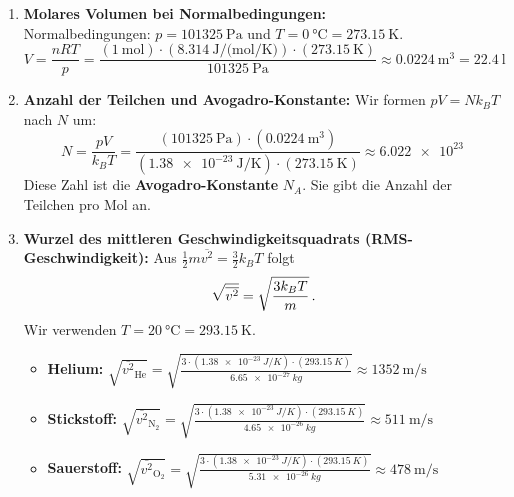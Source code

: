 \documentclass[ngerman]{scrreprt}
\newenvironment{loesungbox}[1]
  {\needspace{5\baselineskip}\begin{loesungboxstyle}[frametitle={#1}]}
  {\end{loesungboxstyle}}
\begin{document}
\begin{loesungbox}{Lösung zu \Cref{aufg:ideale_gase}}
\begin{enumerate}
    \item \textbf{Molares Volumen bei Normalbedingungen:} \\
    Normalbedingungen: $p=\SI{101325}{\pascal}$ und $T = \SI{0}{\celsius} = \SI{273.15}{\kelvin}$. 
    \begin{equation}
        V = \frac{n R T}{p} = \frac{(\SI{1}{\mol}) \cdot (\SI{8.314}{\joule\per(\mol\per\kelvin)}) \cdot (\SI{273.15}{\kelvin})}{\SI{101325}{\pascal}} \approx \SI{0.0224}{\meter\cubed} = \SI{22.4}{\litre}
    \end{equation}
    
    \item \textbf{Anzahl der Teilchen und Avogadro-Konstante:}
    Wir formen $p V = N k_B T$ nach $N$ um: 
    \begin{equation}
        N = \frac{p V}{k_B T} = \frac{(\SI{101325}{\pascal}) \cdot (\SI{0.0224}{\meter\cubed})}{(\SI{1.38e-23}{\joule\per\kelvin}) \cdot (\SI{273.15}{\kelvin})} \approx \SI{6.022e23}{}
    \end{equation}
    Diese Zahl ist die \textbf{Avogadro-Konstante} $N_A$. Sie gibt die Anzahl der Teilchen pro Mol an. 
    
    \item \textbf{Wurzel des mittleren Geschwindigkeitsquadrats (RMS-Geschwindigkeit):}
    Aus $\frac{1}{2}m\overline{v^2} = \frac{3}{2}k_B T$ folgt 
    $$\sqrt{\overline{v^2}} = \sqrt{\frac{3 k_B T}{m}} \,.$$
    Wir verwenden $T = \SI{20}{\celsius} = \SI{293.15}{\kelvin}$.
    \begin{itemize}
        \item \textbf{Helium:} $\sqrt{\overline{v^2}_{\text{He}}} = \sqrt{\frac{3 \cdot (\SI{1.38e-23}{J/K}) \cdot (\SI{293.15}{K})}{\SI{6.65e-27}{kg}}} \approx \SI{1352}{\meter\per\second}$ 
        \item \textbf{Stickstoff:} $\sqrt{\overline{v^2}_{\text{N}_2}} = \sqrt{\frac{3 \cdot (\SI{1.38e-23}{J/K}) \cdot (\SI{293.15}{K})}{\SI{4.65e-26}{kg}}} \approx \SI{511}{\meter\per\second}$ 
        \item \textbf{Sauerstoff:} $\sqrt{\overline{v^2}_{\text{O}_2}} = \sqrt{\frac{3 \cdot (\SI{1.38e-23}{J/K}) \cdot (\SI{293.15}{K})}{\SI{5.31e-26}{kg}}} \approx \SI{478}{\meter\per\second}$ 
    \end{itemize}
\end{enumerate}
\end{loesungbox}
\end{document}
